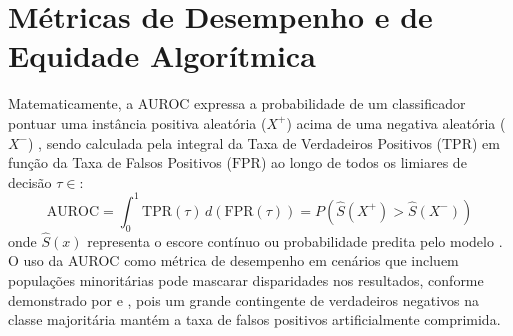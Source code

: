 %

\section{Métricas de Desempenho e de Equidade Algorítmica}
\label{sec:metricas_desempenho_equidade}

Matematicamente, a AUROC expressa a probabilidade de um classificador pontuar uma instância positiva aleatória ($X^+$) acima de uma negativa aleatória ($X^-$) \cite{hanley1982meaning}, sendo calculada pela integral da Taxa de Verdadeiros Positivos ($\text{TPR}$) em função da Taxa de Falsos Positivos ($\text{FPR}$) ao longo de todos os limiares de decisão $\tau \in $:
\begin{equation}
\text{AUROC} = \int_{0}^{1} \text{TPR}(\tau) \, d(\text{FPR}(\tau)) = P(\hat{S}(X^+) > \hat{S}(X^-))
\end{equation}
onde $\hat{S}(x)$ representa o escore contínuo ou probabilidade predita pelo modelo \cite{bradley1997use}. O uso da AUROC como métrica de desempenho em cenários que incluem populações minoritárias pode mascarar disparidades nos resultados, conforme demonstrado por \citet{davis2006relationship} e \citet{saito2015precision}, pois um grande contingente de verdadeiros negativos na classe majoritária mantém a taxa de falsos positivos artificialmente comprimida.

